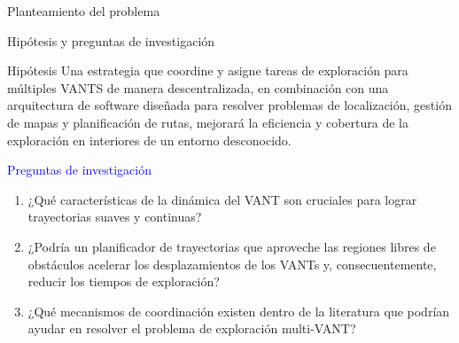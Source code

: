 \documentclass[
  24pt, %
  aspectratio=169, %
]{beamer}
\begin{document}
\begin{frame}{Planteamiento del problema}
  
\end{frame}

\begin{frame}{Hipótesis y preguntas de investigación}
  
  \begin{block}{Hipótesis}
    Una estrategia que coordine y asigne tareas de exploración para múltiples VANTS de manera descentralizada, en combinación con una arquitectura de software diseñada para resolver problemas de localización, gestión de mapas y planificación de rutas, mejorará la eficiencia y cobertura de la exploración en interiores de un entorno desconocido.
  \end{block}
  
  \textcolor{blue}{Preguntas de investigación}
  \begin{enumerate}
  \item ¿Qué características de la dinámica del VANT son cruciales para lograr trayectorias suaves y continuas?
  \item ¿Podría un planificador de trayectorias que aproveche las regiones libres de obstáculos acelerar los desplazamientos de los VANTs y, consecuentemente, reducir los tiempos de exploración?
  \item ¿Qué mecanismos de coordinación existen dentro de la literatura que podrían ayudar en resolver el problema de exploración multi-VANT?
  \end{enumerate}
\end{frame}
\end{document}
